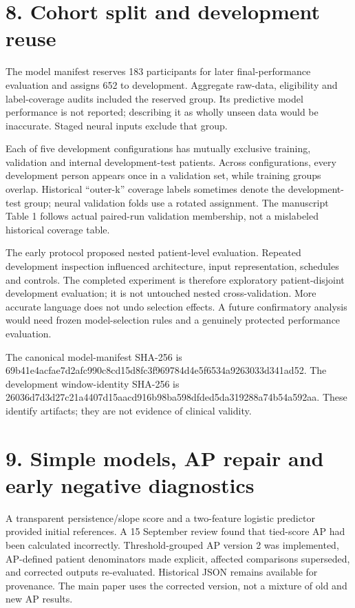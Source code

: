 \documentclass[11pt,a4paper]{article}
\begin{document}
\section*{8. Cohort split and development reuse}
The model manifest reserves 183 participants for later final-performance evaluation and assigns 652 to development. Aggregate raw-data, eligibility and label-coverage audits included the reserved group. Its predictive model performance is not reported; describing it as wholly unseen data would be inaccurate. Staged neural inputs exclude that group.

Each of five development configurations has mutually exclusive training, validation and internal development-test patients. Across configurations, every development person appears once in a validation set, while training groups overlap. Historical “outer-k” coverage labels sometimes denote the development-test group; neural validation folds use a rotated assignment. The manuscript Table 1 follows actual paired-run validation membership, not a mislabeled historical coverage table.

The early protocol proposed nested patient-level evaluation. Repeated development inspection influenced architecture, input representation, schedules and controls. The completed experiment is therefore exploratory patient-disjoint development evaluation; it is not untouched nested cross-validation. More accurate language does not undo selection effects. A future confirmatory analysis would need frozen model-selection rules and a genuinely protected performance evaluation.

The canonical model-manifest SHA-256 is 69b41e4a\allowbreak{}cfae7d2a\allowbreak{}fc990c8c\allowbreak{}d15d8fc3\allowbreak{}f969784d\allowbreak{}4e5f6534\allowbreak{}a9263033\allowbreak{}d341ad52. The development window-identity SHA-256 is 26036d7d\allowbreak{}3d27c21a\allowbreak{}4407d15a\allowbreak{}acd916b9\allowbreak{}8ba598df\allowbreak{}ded5da31\allowbreak{}9288a74b\allowbreak{}54a592aa. These identify artifacts; they are not evidence of clinical validity.

\section*{9. Simple models, AP repair and early negative diagnostics}
A transparent persistence/slope score and a two-feature logistic predictor provided initial references. A 15 September review found that tied-score AP had been calculated incorrectly. Threshold-grouped AP version 2 was implemented, AP-defined patient denominators made explicit, affected comparisons superseded, and corrected outputs re-evaluated. Historical JSON remains available for provenance. The main paper uses the corrected version, not a mixture of old and new AP results.
\end{document}
